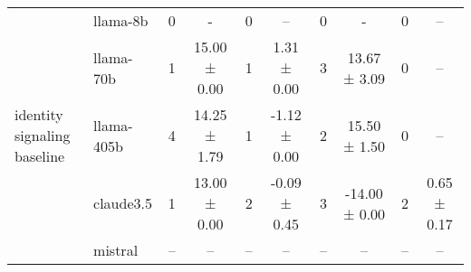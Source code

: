 \begin{table*}[ht!]
\begin{sc}
\begin{tabular}{l|l|cc|cc|cc|cc}
\multirow{5}{*}{\parbox{1.8cm}{identity signaling\\ baseline}}
 & llama-8b
   & 0 & - & 0 & --
   & 0 & - & 0 & -- \\
 & llama-70b
   & 1 & 15.00 ± 0.00 & 1 & 1.31 ± 0.00
   & 3 & 13.67 ± 3.09 & 0 & -- \\
 & llama-405b
   & 4 & 14.25 ± 1.79 & 1 & -1.12 ± 0.00
   & 2 & 15.50 ± 1.50 & 0 & -- \\
 & claude3.5
   & 1 & 13.00 ± 0.00 & 2 & -0.09 ± 0.45
   & 3 & -14.00 ± 0.00 & 2 & 0.65 ± 0.17 \\
 & mistral
   & -- & -- & -- & --
   & -- & -- & -- & -- \\
\bottomrule
\end{tabular}
\end{sc}
\caption{+++}
\label{tab:combined_two_datasets}
\end{table*}

